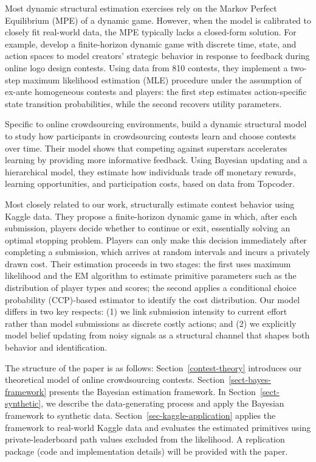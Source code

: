 \documentclass[mnsc]{informs3}
\begin{document}
Most dynamic structural estimation exercises rely on the Markov Perfect Equilibrium (MPE) of a dynamic game.
However, when the model is calibrated to closely fit real-world data, the MPE typically lacks a closed-form solution.
For example, \citet{jiang2022feedback} develop a finite-horizon dynamic game with discrete time, state, and action spaces to model creators’ strategic behavior in response to feedback during online logo design contests.
Using data from 810 contests, they implement a two-step maximum likelihood estimation (MLE) procedure under the assumption of ex-ante homogeneous contests and players: the first step estimates action-specific state transition probabilities, while the second recovers utility parameters.

Specific to online crowdsourcing environments,
\citet{zhang2019structural} build a dynamic structural model to study how participants in crowdsourcing contests learn and choose contests over time.
Their model shows that competing against superstars accelerates learning by providing more informative feedback.
Using Bayesian updating and a hierarchical model, they estimate how individuals trade off monetary rewards, learning opportunities, and participation costs, based on data from Topcoder.

Most closely related to our work, \citet{lemus2021dynamic} structurally estimate contest behavior using Kaggle data.
They propose a finite-horizon dynamic game in which, after each submission, players decide whether to continue or exit, essentially solving an optimal stopping problem.
Players can only make this decision immediately after completing a submission, which arrives at random intervals and incurs a privately drawn cost.
Their estimation proceeds in two stages: the first uses maximum likelihood and the EM algorithm to estimate primitive parameters such as the distribution of player types and scores; the second applies a conditional choice probability (CCP)-based estimator to identify the cost distribution.
Our model differs in two key respects:
(1) we link submission intensity to current effort rather than model submissions as discrete costly actions; and
(2) we explicitly model belief updating from noisy signals as a structural channel that shapes both behavior and identification.







The structure of the paper is as follows:
Section~\ref{contest-theory} introduces our theoretical model of online crowdsourcing contests.
Section~\ref{sect-bayes-framework} presents the Bayesian estimation framework.
In Section~\ref{sect-synthetic}, we describe the data-generating process and apply the Bayesian framework to synthetic data.
Section~\ref{sec-kaggle-application} applies the framework to real-world Kaggle data and evaluates the estimated primitives using private-leaderboard path values excluded from the likelihood.
A replication package (code and implementation details) will be provided with the paper.
\end{document}
